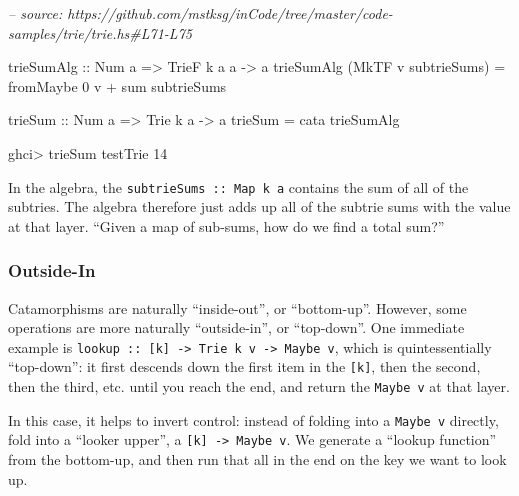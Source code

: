 \documentclass[]{article}
\newenvironment{Shaded}{}{}
\newcommand{\CommentTok}[1]{\textcolor[rgb]{0.38,0.63,0.69}{\textit{#1}}}
\newcommand{\DataTypeTok}[1]{\textcolor[rgb]{0.56,0.13,0.00}{#1}}
\newcommand{\DecValTok}[1]{\textcolor[rgb]{0.25,0.63,0.44}{#1}}
\newcommand{\FunctionTok}[1]{\textcolor[rgb]{0.02,0.16,0.49}{#1}}
\newcommand{\NormalTok}[1]{#1}
\newcommand{\OtherTok}[1]{\textcolor[rgb]{0.00,0.44,0.13}{#1}}
\begin{document}
\begin{Shaded}
\begin{Highlighting}[]
\CommentTok{-- source: https://github.com/mstksg/inCode/tree/master/code-samples/trie/trie.hs#L71-L75}

\OtherTok{trieSumAlg ::} \DataTypeTok{Num}\NormalTok{ a }\OtherTok{=>} \DataTypeTok{TrieF}\NormalTok{ k a a }\OtherTok{->}\NormalTok{ a}
\NormalTok{trieSumAlg (}\DataTypeTok{MkTF}\NormalTok{ v subtrieSums) }\FunctionTok{=}\NormalTok{ fromMaybe }\DecValTok{0}\NormalTok{ v }\FunctionTok{+}\NormalTok{ sum subtrieSums}

\OtherTok{trieSum ::} \DataTypeTok{Num}\NormalTok{ a }\OtherTok{=>} \DataTypeTok{Trie}\NormalTok{ k a }\OtherTok{->}\NormalTok{ a}
\NormalTok{trieSum }\FunctionTok{=}\NormalTok{ cata trieSumAlg}
\end{Highlighting}
\end{Shaded}

\begin{Shaded}
\begin{Highlighting}[]
\NormalTok{ghci}\FunctionTok{>}\NormalTok{ trieSum testTrie}
\DecValTok{14}
\end{Highlighting}
\end{Shaded}

In the algebra, the \texttt{subtrieSums\ ::\ Map\ k\ a} contains the sum of all
of the subtries. The algebra therefore just adds up all of the subtrie sums with
the value at that layer. ``Given a map of sub-sums, how do we find a total
sum?''

\hypertarget{outside-in}{%
\subsubsection{Outside-In}\label{outside-in}}

Catamorphisms are naturally ``inside-out'', or ``bottom-up''. However, some
operations are more naturally ``outside-in'', or ``top-down''. One immediate
example is
\texttt{lookup\ ::\ {[}k{]}\ -\textgreater{}\ Trie\ k\ v\ -\textgreater{}\ Maybe\ v},
which is quintessentially ``top-down'': it first descends down the first item in
the \texttt{{[}k{]}}, then the second, then the third, etc. until you reach the
end, and return the \texttt{Maybe\ v} at that layer.

In this case, it helps to invert control: instead of folding into a
\texttt{Maybe\ v} directly, fold into a ``looker upper'', a
\texttt{{[}k{]}\ -\textgreater{}\ Maybe\ v}. We generate a ``lookup function''
from the bottom-up, and then run that all in the end on the key we want to look
up.
\end{document}
